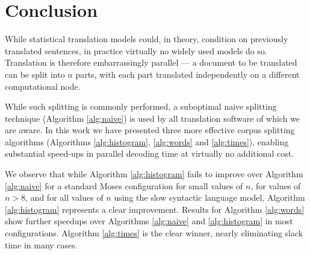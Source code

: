 \documentclass{pbml}
\begin{document}
\section{Conclusion}
%
While statistical translation models could, in theory, condition on previously translated sentences, in practice virtually no widely used models do so.
%
Translation is therefore embarrassingly parallel ---
%
a document to be translated can be split into $n$ parts, with each part translated independently on a different computational node.

While such splitting is commonly performed, a suboptimal naive splitting technique (Algorithm \ref{alg:naive}) is used by all translation software of which we are aware. 
%
In this work we have presented three more effective corpus splitting algorithms (Algorithms \ref{alg:histogram}, \ref{alg:words} and \ref{alg:times}), 
% 
enabling substantial speed-ups in parallel decoding time at virtually no additional cost.

We observe that while Algorithm \ref{alg:histogram} fails to improve over Algorithm \ref{alg:naive} for a standard Moses configuration for small values of $n$, for values of $n>8$, and for all values of $n$ using the slow syntactic language model, Algorithm \ref{alg:histogram} represents a clear improvement. Results for Algorithm \ref{alg:words} show further speedups over Algorithms \ref{alg:naive} and \ref{alg:histogram} in most configurations. Algorithm \ref{alg:times} is the clear winner, nearly eliminating slack time in many cases.

%
%
%
\end{document}
